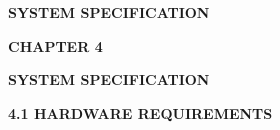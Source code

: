 \vspace*{\fill}
\begin{center}
  {\fontsize{18pt}{24pt}\selectfont\bfseries SYSTEM SPECIFICATION\par}
\end{center}
\vspace*{\fill}
\newpage

\begin{center}
  {\fontsize{16pt}{20pt}\selectfont\bfseries CHAPTER 4\par}
  \vspace{0.3cm}
  {\fontsize{16pt}{20pt}\selectfont\bfseries SYSTEM SPECIFICATION\par}
\end{center}
\vspace{0.4cm}

{\fontsize{14pt}{18pt}\selectfont\bfseries 4.1 HARDWARE REQUIREMENTS\par}
\vspace{0.3cm}

